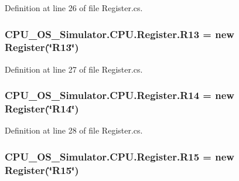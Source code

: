 Definition at line 26 of file Register.\+cs.

\hypertarget{class_c_p_u___o_s___simulator_1_1_c_p_u_1_1_register_adb4ed15863b50ae94a10416d9fc35a34}{}
\subsubsection[{R13}]{ C\+P\+U\+\_\+\+O\+S\+\_\+\+Simulator.\+C\+P\+U.\+Register.\+R13 = new {\bf Register}(\char`\"{}R13\char`\"{})\hspace{0.3cm}{\ttfamily [static]}}\label{class_c_p_u___o_s___simulator_1_1_c_p_u_1_1_register_adb4ed15863b50ae94a10416d9fc35a34}


Definition at line 27 of file Register.\+cs.

\hypertarget{class_c_p_u___o_s___simulator_1_1_c_p_u_1_1_register_ad2c93dc9788349569aac3a5ba60f7581}{}
\subsubsection[{R14}]{ C\+P\+U\+\_\+\+O\+S\+\_\+\+Simulator.\+C\+P\+U.\+Register.\+R14 = new {\bf Register}(\char`\"{}R14\char`\"{})\hspace{0.3cm}{\ttfamily [static]}}\label{class_c_p_u___o_s___simulator_1_1_c_p_u_1_1_register_ad2c93dc9788349569aac3a5ba60f7581}


Definition at line 28 of file Register.\+cs.

\hypertarget{class_c_p_u___o_s___simulator_1_1_c_p_u_1_1_register_a643aa109f6aea2e44a92aca9cd62b2df}{}
\subsubsection[{R15}]{ C\+P\+U\+\_\+\+O\+S\+\_\+\+Simulator.\+C\+P\+U.\+Register.\+R15 = new {\bf Register}(\char`\"{}R15\char`\"{})\hspace{0.3cm}{\ttfamily [static]}}\label{class_c_p_u___o_s___simulator_1_1_c_p_u_1_1_register_a643aa109f6aea2e44a92aca9cd62b2df}


